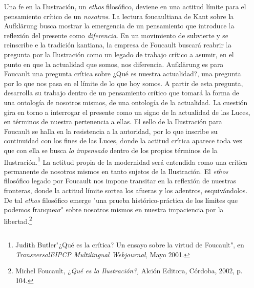Una fe en la Ilustración, un \emph{ethos} filosófico, deviene en una
actitud límite para el pensamiento crítico de un \emph{nosotros}. La
lectura foucaultiana de Kant sobre la Aufklärung busca mostrar la
emergencia de un pensamiento que introduce la reflexión del presente
como \emph{diferencia}. En un movimiento de subvierte y se reinscribe e
la tradición kantiana, la empresa de Foucault buscará reabrir la
pregunta por la Ilustración como un legado de trabajo crítico a asumir,
en el punto en que la actualidad que somos, nos diferencia. Aufklärung
es para Foucault una pregunta crítica sobre ¿Qué es nuestra actualidad?,
una pregunta por lo que nos pasa en el límite de lo que hoy somos. A
partir de esta pregunta, desarrolla su trabajo dentro de un pensamiento
crítico que tomará la forma de una ontología de nosotros mismos, de una
ontología de la actualidad. La cuestión gira en torno a interrogar el
presente como un signo de la actualidad de las Luces, en términos de
nuestra pertenencia a ellas. El sello de la Ilustración para Foucault se
halla en la resistencia a la autoridad, por lo que inscribe su
continuidad con los fines de las Luces, donde la actitud crítica aparece
toda vez que con ella se busca \emph{lo impensado} dentro de los propios
términos de la Ilustración.\footnote{Judith Butler"¿Qué es la crítica?
  Un ensayo sobre la virtud de Foucault", en \emph{TransversalEIPCP
  Multilingual Webjournal}, Mayo 2001.} La actitud propia de la
modernidad será entendida como una crítica permanente de nosotros mismos
en tanto sujetos de la Ilustración. El \emph{ethos} filosófico legado
por Foucault nos impone transitar en la reflexión de nuestras fronteras,
donde la actitud límite sortea los afueras y los adentros,
esquivándolos. De tal \emph{ethos} filosófico emerge "una prueba
histórico-práctica de los límites que podemos franquear" sobre nosotros
mismos en nuestra impaciencia por la libertad.\footnote{Michel Foucault,
  ¿\emph{Qué es la Ilustración?,} Alción Editora, Córdoba, 2002, p. 104.}

